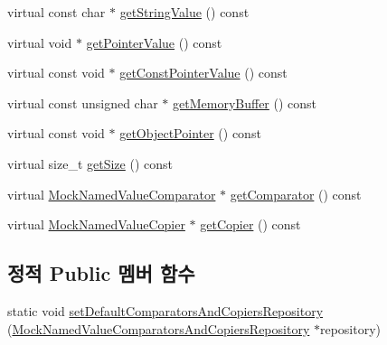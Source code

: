 \begin{DoxyCompactItemize}
virtual const char $\ast$ \hyperlink{class_mock_named_value_a6b3700ff1b64ad559094bb4ea0017353}{get\+String\+Value} () const 
\item 
virtual void $\ast$ \hyperlink{class_mock_named_value_a841cebf86eaad9de0cb3755466ae34be}{get\+Pointer\+Value} () const 
\item 
virtual const void $\ast$ \hyperlink{class_mock_named_value_a3e3eb7694ed79472dadc96359067e832}{get\+Const\+Pointer\+Value} () const 
\item 
virtual const unsigned char $\ast$ \hyperlink{class_mock_named_value_adad84e2750c749c1b58b68907d08fdda}{get\+Memory\+Buffer} () const 
\item 
virtual const void $\ast$ \hyperlink{class_mock_named_value_a4d4696a9a24da96598cfbe4865c23c66}{get\+Object\+Pointer} () const 
\item 
virtual size\+\_\+t \hyperlink{class_mock_named_value_af55b3790622878d65ed5ff2bb2b3fcc4}{get\+Size} () const 
\item 
virtual \hyperlink{class_mock_named_value_comparator}{Mock\+Named\+Value\+Comparator} $\ast$ \hyperlink{class_mock_named_value_ab38ffc6977031a9feb222165ad258089}{get\+Comparator} () const 
\item 
virtual \hyperlink{class_mock_named_value_copier}{Mock\+Named\+Value\+Copier} $\ast$ \hyperlink{class_mock_named_value_a40fe9225b38a6cf65b71ae55c5e581a8}{get\+Copier} () const 
\end{DoxyCompactItemize}
\subsection*{정적 Public 멤버 함수}
\begin{DoxyCompactItemize}
\item 
static void \hyperlink{class_mock_named_value_a3588b9134e06ada808cfc04a11fcc7a7}{set\+Default\+Comparators\+And\+Copiers\+Repository} (\hyperlink{class_mock_named_value_comparators_and_copiers_repository}{Mock\+Named\+Value\+Comparators\+And\+Copiers\+Repository} $\ast$repository)
\end{DoxyCompactItemize}
